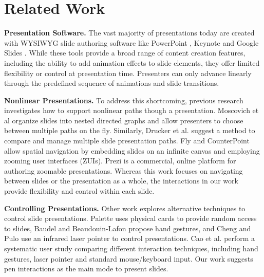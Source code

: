 \section{Related Work}

\textbf{Presentation Software.} The vast majority of presentations today are created with WYSIWYG slide authoring software like PowerPoint \cite{powerpoint2017}, Keynote \cite{keynote2017} and Google Slides \cite{googleslides2017}. 
%
While these tools provide a broad range of content creation features, including the ability to add animation effects to slide elements, 
they offer limited flexibility or control at presentation time. 
%
Presenters can only advance linearly through the predefined sequence of animations and slide transitions.

\textbf{Nonlinear Presentations.} To address this shortcoming, previous research investigates how to support nonlinear paths though a presentation. Moscovich et al \cite{moscovich2004customizable} organize slides into nested directed graphs and allow presenters to choose between multiple paths on the fly. Similarly, Drucker et al. \cite{drucker2006comparing} suggest a method to compare and manage multiple slide presentation paths. Fly \cite{lichtschlag2009fly} and CounterPoint \cite{good2002zoomable} allow spatial navigation by embedding slides on an infinite canvas and employing zooming user interfaces (ZUIs). Prezi \cite{prezi2017} is a commercial, online platform for authoring zoomable presentations. Whereas this work focuses on navigating between slides or the presentation as a whole, the interactions in our work provide flexibility and control within each slide.

\textbf{Controlling Presentations.} Other work explores alternative techniques to control slide presentations. Palette \cite{nelson1999palette} uses physical cards to provide random access to slides, Baudel and Beaudouin-Lafon \cite{baudel1993charade} propose hand gestures, and Cheng and Pulo \cite{cheng2003direct} use an infrared laser pointer to control presentations. Cao et al. \cite{cao2005evaluation} perform a systematic user study comparing different interaction techniques, including hand gestures, laser pointer and standard mouse/keyboard input. Our work suggests pen interactions  as the main mode to present slides.

